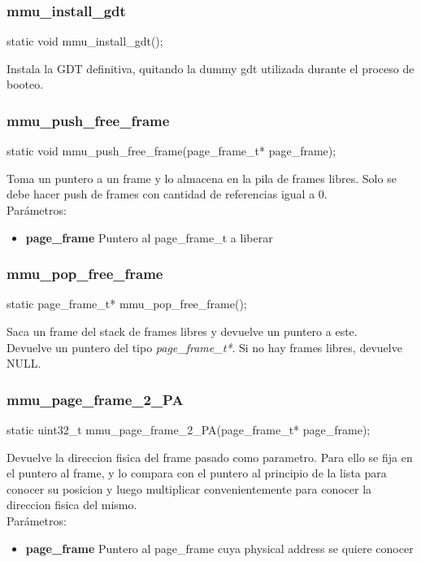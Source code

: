 \subsubsection{mmu\_install\_gdt}
\begin{verbatimtab}
static void mmu_install_gdt();
\end{verbatimtab}
Instala la GDT definitiva, quitando la dummy gdt utilizada durante el proceso de booteo.

\subsubsection{mmu\_push\_free\_frame}
\begin{verbatimtab}
static void mmu_push_free_frame(page_frame_t* page_frame);
\end{verbatimtab}
Toma un puntero a un frame y lo almacena en la pila de frames libres. Solo se debe hacer push de frames con cantidad de referencias igual a 0. \\
Parámetros:
\begin{itemize}
 \item \textbf{page\_frame} Puntero al page\_frame\_t a liberar
\end{itemize}

\subsubsection{mmu\_pop\_free\_frame}
\begin{verbatimtab}
static page_frame_t* mmu_pop_free_frame();
\end{verbatimtab}
Saca un frame del stack de frames libres y devuelve un puntero a este. \\
Devuelve un puntero del tipo\textit{ page\_frame\_t*}. Si no hay frames libres, devuelve NULL.

\subsubsection{mmu\_page\_frame\_2\_PA}
\begin{verbatimtab}
static uint32_t mmu_page_frame_2_PA(page_frame_t* page_frame);
\end{verbatimtab}
Devuelve la direccion fisica del frame pasado como parametro. Para ello se fija en el puntero al frame, y lo compara con el puntero 
al principio de la lista para conocer su posicion y luego multiplicar convenientemente para conocer la direccion fisica del mismo.\\
Parámetros:
 \begin{itemize}
  \item \textbf{page\_frame} Puntero al page\_frame cuya physical address se quiere conocer
 \end{itemize}

